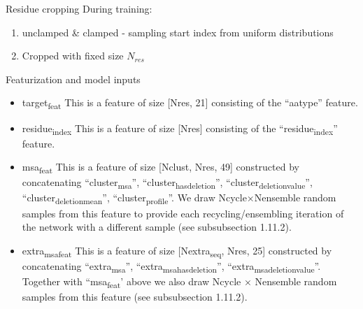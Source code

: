 \documentclass[presentation, smaller]{beamer}
\begin{document}
\begin{frame}[label={sec:org378f9c9}]{Residue cropping}
During training:
\begin{enumerate}
\item unclamped \& clamped - sampling start index from uniform distributions
\item Cropped with fixed size \(N_{res}\)
\end{enumerate}
\cite{jumperHighlyAccurateProtein2021}
\end{frame}
\begin{frame}[label={sec:orgdf1abfc}]{Featurization and model inputs}
\begin{itemize}
\item \alert{target\textsubscript{feat}}
This is a feature of size [Nres, 21] consisting of the “aatype” feature.
\item \alert{residue\textsubscript{index}}
This is a feature of size [Nres] consisting of the “residue\textsubscript{index}” feature.
\item \alert{msa\textsubscript{feat}}
This is a feature of size [Nclust, Nres, 49] constructed by concatenating “cluster\textsubscript{msa}”, “cluster\textsubscript{has}\textsubscript{deletion}”, “cluster\textsubscript{deletion}\textsubscript{value}”, “cluster\textsubscript{deletion}\textsubscript{mean}”, “cluster\textsubscript{profile}”. We draw Ncycle×Nensemble random samples from this feature to provide each recycling/ensembling iteration of the network with a different sample (see subsubsection 1.11.2).
\item \alert{extra\textsubscript{msa}\textsubscript{feat}}
This is a feature of size [Nextra\textsubscript{seq}, Nres, 25] constructed by concatenating “extra\textsubscript{msa}”, “extra\textsubscript{msa}\textsubscript{has}\textsubscript{deletion}”, “extra\textsubscript{msa}\textsubscript{deletion}\textsubscript{value}”. Together with “msa\textsubscript{feat}’ above we also draw Ncycle × Nensemble random samples from this feature (see subsubsection 1.11.2).~\cite{jumperHighlyAccurateProtein2021}
\end{itemize}
\end{frame}
\end{document}
